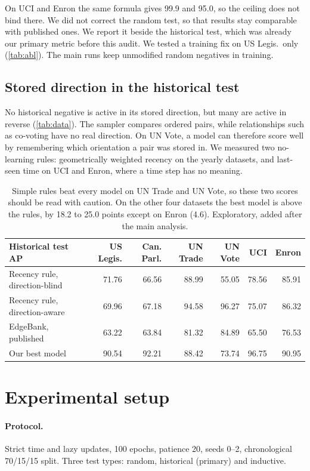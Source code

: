 \documentclass[11pt,a4paper]{article}
\theoremstyle{remark}
\begin{document}
On UCI and Enron the same formula gives 99.9 and 95.0, so the ceiling does not bind there. We did not correct the random test, so that results stay comparable with published ones. We report it beside the historical test, which was already our primary metric before this audit. We tested a training fix on US Legis.\ only (\cref{tab:abl}). The main runs keep unmodified random negatives in training.

\subsection{Stored direction in the historical test}\label{sec:direction}
No historical negative is active in its stored direction, but many are active in reverse (\cref{tab:data}). The sampler compares ordered pairs, while relationships such as co-voting have no real direction. On UN Vote, a model can therefore score well by remembering which orientation a pair was stored in. We measured two no-learning rules: geometrically weighted recency on the yearly datasets, and last-seen time on UCI and Enron, where a time step has no meaning.
\begin{table}[h]\centering\small
\begin{tabular}{lrrrrrr}
\toprule
Historical test AP & US Legis. & Can. Parl. & UN Trade & UN Vote & UCI & Enron\\
\midrule
Recency rule, direction-blind & 71.76 & 66.56 & 88.99 & 55.05 & 78.56 & 85.91\\
Recency rule, direction-aware & 69.96 & 67.18 & 94.58 & 96.27 & 75.07 & 86.32\\
EdgeBank, published \cite{tpnet} & 63.22 & 63.84 & 81.32 & 84.89 & 65.50 & 76.53\\
Our best model & 90.54 & 92.21 & 88.42 & 73.74 & 96.75 & 90.95\\
\bottomrule
\end{tabular}
\caption{Simple rules beat every model on UN Trade and UN Vote, so these two scores should be read with caution. On the other four datasets the best model is above the rules, by 18.2 to 25.0 points except on Enron (4.6). Exploratory, added after the main analysis.}\label{tab:rules}
\end{table}

\section{Experimental setup}
\paragraph{Protocol.} Strict time and lazy updates, 100 epochs, patience 20, seeds 0--2, chronological 70/15/15 split. Three test types: random, historical (primary) and inductive.
\end{document}
